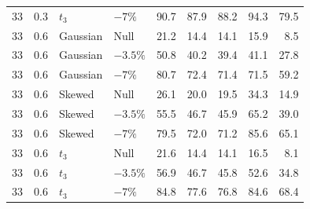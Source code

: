 \begin{table}[H]
\begin{tabular*}{\textwidth}{@{\extracolsep{\fill}}rrllrrrrr}
33 & 0.3 & $t_3$ & $-7\%$ & 90.7 & 87.9 & 88.2 & 94.3 & 79.5 \\
33 & 0.6 & Gaussian & Null & 21.2 & 14.4 & 14.1 & 15.9 & 8.5 \\
33 & 0.6 & Gaussian & $-3.5\%$ & 50.8 & 40.2 & 39.4 & 41.1 & 27.8 \\
33 & 0.6 & Gaussian & $-7\%$ & 80.7 & 72.4 & 71.4 & 71.5 & 59.2 \\
33 & 0.6 & Skewed & Null & 26.1 & 20.0 & 19.5 & 34.3 & 14.9 \\
33 & 0.6 & Skewed & $-3.5\%$ & 55.5 & 46.7 & 45.9 & 65.2 & 39.0 \\
33 & 0.6 & Skewed & $-7\%$ & 79.5 & 72.0 & 71.2 & 85.6 & 65.1 \\
33 & 0.6 & $t_3$ & Null & 21.6 & 14.4 & 14.1 & 16.5 & 8.1 \\
33 & 0.6 & $t_3$ & $-3.5\%$ & 56.9 & 46.7 & 45.8 & 52.6 & 34.8 \\
33 & 0.6 & $t_3$ & $-7\%$ & 84.8 & 77.6 & 76.8 & 84.6 & 68.4 \\
\bottomrule
\end{tabular*}
\end{table}

